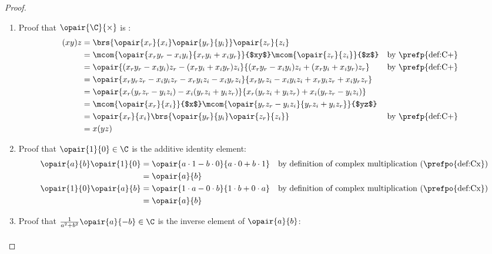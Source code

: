\begin{proof}
\begin{enumerate}
  \item Proof that $\opair{\C}{\times}$ is :
    \begin{align*}
        (xy)z
          &= \brs{\opair{x_r}{x_i}\opair{y_r}{y_i}}\opair{z_r}{z_i}
        \\&= \mcom{\opair{x_ry_r-x_iy_i}{x_ry_i+x_iy_r}}{$xy$}
             \mcom{\opair{z_r}{z_i}}{$z$}
          && \text{by \prefp{def:C+}}
        \\&= \opair{(x_ry_r-x_iy_i)z_r-(x_ry_i+x_iy_r)z_i}{(x_ry_r-x_iy_i)z_i+(x_ry_i+x_iy_r)z_r}
          && \text{by \prefp{def:C+}}
        \\&= \opair{x_ry_rz_r-x_iy_iz_r-x_ry_iz_i-x_iy_rz_i}{x_ry_rz_i-x_iy_iz_i+x_ry_iz_r+x_iy_rz_r}
        \\&= \opair{x_r(y_rz_r-y_iz_i) - x_i(y_rz_i+y_iz_r)}
                   {x_r(y_rz_i+y_iz_r) + x_i(y_rz_r-y_iz_i)}
        \\&= \mcom{\opair{x_r}{x_i}}{$x$}
             \mcom{\opair{y_rz_r-y_iz_i}{y_rz_i+y_iz_r}}{$yz$}
        \\&= \opair{x_r}{x_i}\brs{\opair{y_r}{y_i}\opair{z_r}{z_i}}
          && \text{by \prefp{def:C+}}
        \\&= x(yz)
      \end{align*}
%
  \item Proof that $\opair{1}{0}\in\C$ is the additive identity element:
    \begin{align*}
      \opair{a}{b}\opair{1}{0}
        &= \opair{a\cdot1-b\cdot0}{a\cdot0+b\cdot1}
         && \text{by definition of complex multiplication (\prefpo{def:Cx})}
      \\&= \opair{a}{b}
        \\
      \opair{1}{0}\opair{a}{b}
        &= \opair{1\cdot a-0\cdot b}{1\cdot b+0\cdot a}
         && \text{by definition of complex multiplication (\prefpo{def:Cx})}
      \\&= \opair{a}{b}
    \end{align*}
  \item  Proof that $\frac{1}{a^2+b^2}\opair{a}{-b}\in\C$ is the inverse element of $\opair{a}{b}$:
    \begin{align*}

\end{align*}
\end{enumerate}
\end{proof}
